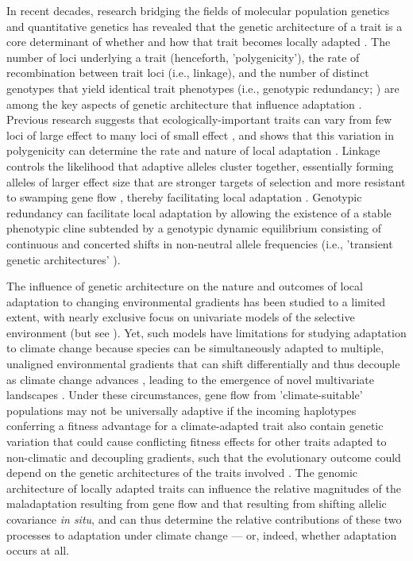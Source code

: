 \documentclass[9pt,twocolumn,twoside,lineno]{pnas-new}
\begin{document}
In recent decades, research bridging the fields
of molecular population genetics
and quantitative genetics
\cite{barghi_polygenic,barton,pritchard_human_adaptation,pritchard_sweeps_alone}
has revealed that the genetic architecture of a trait
is a core determinant of whether and how that trait
becomes locally adapted \cite{yeaman_review}.
The number of loci underlying a trait (henceforth, 'polygenicity'),
the rate of recombination between trait loci (i.e., linkage),
and the number of distinct genotypes that yield identical trait phenotypes
(i.e., genotypic redundancy; \cite{yeaman_review,laruson,barghi_polygenic})
are among the key aspects of genetic architecture that influence adaptation
\cite{barton,yeaman_whitlock,yeaman_review,lecorre}.
Previous research suggests that ecologically-important traits can vary from
few loci of large effect \cite{martin,rees}
to many loci of small effect \cite{boyle,rockman,savolainen,sella,barghi_polygenic},
and shows that this variation in polygenicity can
determine the rate and nature of local adaptation \cite{yeaman_amnat}. 
Linkage controls the likelihood that adaptive alleles cluster together,
essentially forming alleles of larger effect size that are stronger 
targets of selection and more resistant
to swamping gene flow \cite{yeaman_whitlock},
thereby facilitating local adaptation \cite{tigano}.
Genotypic redundancy can facilitate local adaptation 
by allowing the existence of a stable phenotypic cline
subtended by a genotypic dynamic equilibrium
consisting of continuous and concerted shifts in non-neutral allele frequencies
(i.e., 'transient genetic architectures' \cite{barghi_redundancy,manceau,yeaman_amnat}).

The influence of genetic architecture on the nature and outcomes
of local adaptation to changing environmental gradients
has been studied to a limited extent,
with nearly exclusive focus on univariate models
of the selective environment (but see \cite{schiffers}).
Yet, such models have limitations for studying adaptation to climate change
because species can be simultaneously adapted to multiple,
unaligned environmental gradients \cite{guillaume} that can shift differentially
and thus decouple as climate change advances
\cite{crimmins,daly},
leading to the emergence of novel multivariate landscapes
\cite{williams_novel_climates,williams_projected_novel_disappearing,fitzpatrick_climate_novelty_forecasts}.
Under these circumstances,
gene flow from 'climate-suitable' populations
may not be universally adaptive
if the incoming haplotypes conferring
a fitness advantage for a climate-adapted trait
also contain genetic variation that could cause conflicting
fitness effects for other traits adapted to non-climatic and decoupling gradients,
such that the evolutionary outcome could depend on
the genetic architectures of the traits involved
\cite{aitken_whitlock,schiffers}.
The genomic architecture of locally adapted traits
can influence the relative magnitudes of the maladaptation resulting from gene flow
and that resulting from shifting allelic covariance \textit{in situ},
and can thus determine the relative contributions of these two processes to
 adaptation under climate change --- or, indeed,
whether adaptation occurs at all.
\end{document}
